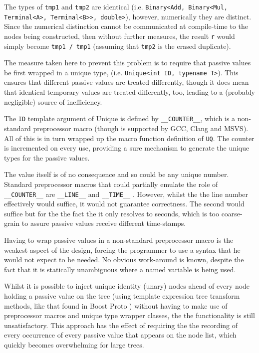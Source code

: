 \documentclass[a4paper,10pt]{article}
\begin{document}
The types of \texttt{tmp1} and \texttt{tmp2} are identical (i.e. \texttt{Binary<Add, Binary<Mul, Terminal<A>, Terminal<B>>, double>}),
however, numerically they are distinct. Since the numerical distinction cannot be communicated at compile-time to the
nodes being constructed, then without further measures, the result \texttt{r} would simply become \texttt{tmp1 / tmp1} (assuming
that \texttt{tmp2} is the erased duplicate).

The measure taken here to prevent this problem is to require that passive values be first wrapped in a unique
type, (i.e. \texttt{Unique<int ID, typename T>}). This ensures that different passive values are treated differently, though
it does mean that identical temporary values are treated differently, too, leading to a (probably negligible) source of
inefficiency.

The \texttt{ID} template argument of Unique is defined by \texttt{\_\_COUNTER\_\_}, which is a non-standard preprocessor macro (though
is supported by GCC, Clang and MSVS). All of this is in turn wrapped up the macro function definition of \texttt{UQ}. The
counter is incremented on every use, providing a sure mechanism to generate the unique types for the passive values.

The value itself is of no consequence and so could be any unique number. Standard preprocessor macros that could
partially emulate the role of \texttt{\_\_COUNTER\_\_} are \texttt{\_\_LINE\_\_} and \texttt{\_\_TIME\_\_} . However, whilst the the line number effectively
would suffice, it would not guarantee correctness. The second would suffice but for the the fact the it only resolves to
seconds, which is too coarse-grain to assure passive values receive different time-stamps.

Having to wrap passive values in a non-standard preprocessor macro is the weakest aspect of the design, forcing
the programmer to use a syntax that he would not expect to be needed. No obvious work-around is known, despite
the fact that it is statically unambiguous where a named variable is being used.

Whilst it is possible to inject unique identity (unary) nodes ahead of every node holding a passive value on the tree
(using template expression tree transform methods, like that found in Boost Proto \citep{Niebler2008}) without having to make use of preprocessor macros and unique
type wrapper classes, the the functionality is still unsatisfactory. This approach has the effect of requiring the the
recording of every occurrence of every passive value that appears on the node list, which quickly becomes overwhelming
for large trees.
\end{document}
